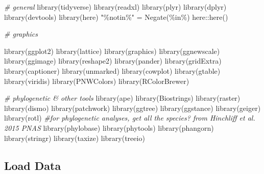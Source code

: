 \documentclass[
]{article}
\newenvironment{Shaded}{\begin{snugshade}}{\end{snugshade}}
\newcommand{\CommentTok}[1]{\textcolor[rgb]{0.56,0.35,0.01}{\textit{#1}}}
\newcommand{\FunctionTok}[1]{\textcolor[rgb]{0.00,0.00,0.00}{#1}}
\newcommand{\NormalTok}[1]{#1}
\newcommand{\OtherTok}[1]{\textcolor[rgb]{0.56,0.35,0.01}{#1}}
\newcommand{\SpecialCharTok}[1]{\textcolor[rgb]{0.00,0.00,0.00}{#1}}
\newcommand{\StringTok}[1]{\textcolor[rgb]{0.31,0.60,0.02}{#1}}
\begin{document}
\begin{Shaded}
\begin{Highlighting}[]
\CommentTok{\# general}
\FunctionTok{library}\NormalTok{(tidyverse)}
\FunctionTok{library}\NormalTok{(readxl)}
\FunctionTok{library}\NormalTok{(plyr)}
\FunctionTok{library}\NormalTok{(dplyr)}
\FunctionTok{library}\NormalTok{(devtools)}
\FunctionTok{library}\NormalTok{(here)}
\StringTok{"\%notin\%"} \OtherTok{=} \FunctionTok{Negate}\NormalTok{(}\StringTok{\textquotesingle{}\%in\%\textquotesingle{}}\NormalTok{)}
\NormalTok{here}\SpecialCharTok{::}\FunctionTok{here}\NormalTok{()}

\CommentTok{\# graphics}

\FunctionTok{library}\NormalTok{(ggplot2)}
\FunctionTok{library}\NormalTok{(lattice)}
\FunctionTok{library}\NormalTok{(graphics)}
\FunctionTok{library}\NormalTok{(ggnewscale)}
\FunctionTok{library}\NormalTok{(ggimage)}
\FunctionTok{library}\NormalTok{(reshape2)}
\FunctionTok{library}\NormalTok{(pander)}
\FunctionTok{library}\NormalTok{(gridExtra)}
\FunctionTok{library}\NormalTok{(captioner)}
\FunctionTok{library}\NormalTok{(unmarked)}
\FunctionTok{library}\NormalTok{(cowplot)}
\FunctionTok{library}\NormalTok{(gtable)}
\FunctionTok{library}\NormalTok{(viridis)}
\FunctionTok{library}\NormalTok{(PNWColors)}
\FunctionTok{library}\NormalTok{(RColorBrewer)}

\CommentTok{\# phylogenetic \& other tools}
\FunctionTok{library}\NormalTok{(ape)}
\FunctionTok{library}\NormalTok{(Biostrings)}
\FunctionTok{library}\NormalTok{(raster)}
\FunctionTok{library}\NormalTok{(dismo)}
\FunctionTok{library}\NormalTok{(patchwork)}
\FunctionTok{library}\NormalTok{(ggtree)}
\FunctionTok{library}\NormalTok{(ggstance)}
\FunctionTok{library}\NormalTok{(geiger)}
\FunctionTok{library}\NormalTok{(rotl) }\CommentTok{\#for phylogenetic analyses, get all the species? from Hinchliff et al. 2015 PNAS}
\FunctionTok{library}\NormalTok{(phylobase)}
\FunctionTok{library}\NormalTok{(phytools)}
\FunctionTok{library}\NormalTok{(phangorn)}
\FunctionTok{library}\NormalTok{(stringr)}
\FunctionTok{library}\NormalTok{(taxize)}
\FunctionTok{library}\NormalTok{(treeio)}
\end{Highlighting}
\end{Shaded}

\hypertarget{load-data}{%
\subsection{Load Data}\label{load-data}}
\end{document}
